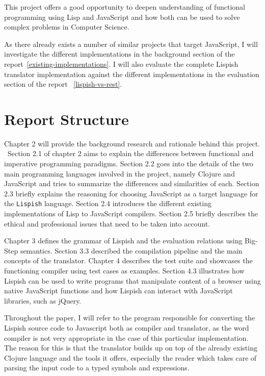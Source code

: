 \documentclass[11pt]{informatics-report}
\begin{document}
This project offers a good opportunity to deepen understanding of functional programming using Lisp and JavaScript and how both can be used to solve complex problems in Computer Science. 

As there already exists a number of similar projects that target JavaScript, I will investigate the different implementations in the background section of the report~\ref{existing-implementations}.
I will also evaluate the complete Lispish translator implementation against the different implementations in the evaluation section of the report ~\ref{lispish-vs-rest}.

\section{Report Structure}
Chapter 2 will provide the background research and rationale behind this project. \
Section 2.1 of chapter 2 aims to explain the differences between functional and imperative programming paradigms. 
Section 2.2 goes into the details of the two main programming languages involved in the project, namely Clojure and JavaScript and tries to summarize the differences and similarities of each. 
Section 2.3 briefly explains the reasoning for choosing JavaScript as a target language for the \texttt{Lispish} language.
Section 2.4 introduces the different existing implementations of Lisp to JavaScript compilers.
Section 2.5 briefly describes the ethical and professional issues that need to be taken into account. 

Chapter 3 defines the grammar of Lispish and the evaluation relations using Big-Step semantics. Section 3.3 described the compilation pipeline and the main concepts of the translator.
Chapter 4 describes the test suite and showcases the functioning compiler using test cases as examples. Section 4.3 illustrates how Lispish can be used to write programs that manipulate content of a browser using native JavaScript functions and how Lispish can interact with JavaScript libraries, such as jQuery.

Throughout the paper, I will refer to the program responsible for converting the Lispish source code to Javascript both as compiler and translator, as the word compiler is not very appropriate in the case of this particular implementation. 
The reason for this is that the translator builds up on top of the already existing Clojure language and the tools it offers, especially the reader which takes care of parsing the input code to a typed symbols and expressions. 

\listoffigures









\nocite{*}

\appendix



\end{document}
